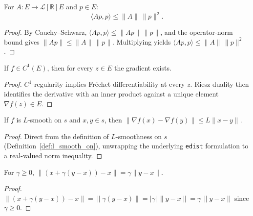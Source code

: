 \begin{lemma}\label{lem:inner_le_opNorm_mul_norm_sq}
  \leanok{}
  \uses{}
  For $A:E\to\mathcal{L}[\mathbb{R}]E$ and $p\in E$:
  \[
  \langle Ap,p\rangle \le \|A\|\,\|p\|^2.
  \]
\end{lemma}
\begin{proof}
  \leanok{}
  By Cauchy--Schwarz, $\langle Ap,p\rangle \le \|Ap\|\,\|p\|$, and the operator-norm bound gives
  $\|Ap\| \le \|A\|\,\|p\|$. Multiplying yields $\langle Ap,p\rangle \le \|A\|\,\|p\|^2$.
\end{proof}

\begin{lemma}\label{lem:hasGradientAt_of_contDiff_one}
  \leanok{}
  \uses{}
  If $f\in C^1(E)$, then for every $z\in E$ the gradient exists. %
\end{lemma}
\begin{proof}
  \leanok{}
  $C^1$-regularity implies Fr\'echet differentiability at every $z$. Riesz duality then identifies
  the derivative with an inner product against a unique element $\nabla f(z)\in E$.
\end{proof}

\begin{lemma}\label{lem:norm_gradient_sub_le}
  \leanok{}
  If $f$ is $L$-smooth on $s$ and $x,y\in s$, then
  $\|\nabla f(x)-\nabla f(y)\|\le L\|x-y\|$.
\end{lemma}
\begin{proof}
  \leanok{}
  Direct from the definition of $L$-smoothness on $s$ (Definition~\ref{def:l_smooth_on}), unwrapping
  the underlying \texttt{edist} formulation to a real-valued norm inequality.
\end{proof}

\begin{lemma}\label{lem:norm_add_smul_sub_eq}
  \leanok{}
  \uses{}
  For $\gamma\ge 0$,
  $\|(x+\gamma(y-x))-x\|=\gamma\|y-x\|$.
\end{lemma}
\begin{proof}
  \leanok{}
  $\|(x+\gamma(y-x))-x\| = \|\gamma(y-x)\| = |\gamma|\,\|y-x\| = \gamma\,\|y-x\|$ since $\gamma\ge 0$.
\end{proof}

